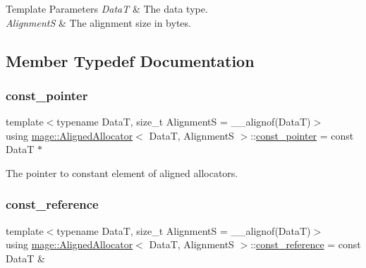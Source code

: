\begin{DoxyTemplParams}{Template Parameters}
{\em DataT} & The data type. \\
\hline
{\em AlignmentS} & The alignment size in bytes. \\
\hline
\end{DoxyTemplParams}


\subsection{Member Typedef Documentation}
\hypertarget{structmage_1_1_aligned_allocator_a959cb724f93b205c290ff2ecbd146254}{}\label{structmage_1_1_aligned_allocator_a959cb724f93b205c290ff2ecbd146254} 
\subsubsection{\texorpdfstring{const\+\_\+pointer}{const\_pointer}}
{\footnotesize\ttfamily template$<$typename DataT, size\+\_\+t AlignmentS = \+\_\+\+\_\+alignof(\+Data\+T)$>$ \\
using \hyperlink{structmage_1_1_aligned_allocator}{mage\+::\+Aligned\+Allocator}$<$ DataT, AlignmentS $>$\+::\hyperlink{structmage_1_1_aligned_allocator_a959cb724f93b205c290ff2ecbd146254}{const\+\_\+pointer} =  const DataT $\ast$}

The pointer to constant element of aligned allocators. \hypertarget{structmage_1_1_aligned_allocator_a97c3aca3eba1b0a5a6c68d5c444b36e9}{}\label{structmage_1_1_aligned_allocator_a97c3aca3eba1b0a5a6c68d5c444b36e9} 
\subsubsection{\texorpdfstring{const\+\_\+reference}{const\_reference}}
{\footnotesize\ttfamily template$<$typename DataT, size\+\_\+t AlignmentS = \+\_\+\+\_\+alignof(\+Data\+T)$>$ \\
using \hyperlink{structmage_1_1_aligned_allocator}{mage\+::\+Aligned\+Allocator}$<$ DataT, AlignmentS $>$\+::\hyperlink{structmage_1_1_aligned_allocator_a97c3aca3eba1b0a5a6c68d5c444b36e9}{const\+\_\+reference} =  const DataT \&}

